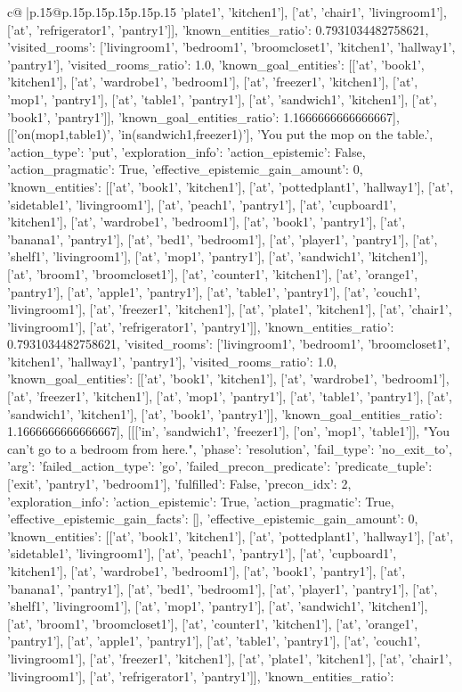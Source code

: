 \documentclass{article}
\begin{document}
{\begin{supertabular}{c@{$\;$}|p{.15\linewidth}@{}p{.15\linewidth}p{.15\linewidth}p{.15\linewidth}p{.15\linewidth}p{.15\linewidth}}
{{{'plate1', 'kitchen1'], ['at', 'chair1', 'livingroom1'], ['at', 'refrigerator1', 'pantry1']], 'known_entities_ratio': 0.7931034482758621, 'visited_rooms': ['livingroom1', 'bedroom1', 'broomcloset1', 'kitchen1', 'hallway1', 'pantry1'], 'visited_rooms_ratio': 1.0, 'known_goal_entities': [['at', 'book1', 'kitchen1'], ['at', 'wardrobe1', 'bedroom1'], ['at', 'freezer1', 'kitchen1'], ['at', 'mop1', 'pantry1'], ['at', 'table1', 'pantry1'], ['at', 'sandwich1', 'kitchen1'], ['at', 'book1', 'pantry1']], 'known_goal_entities_ratio': 1.1666666666666667}}], [['on(mop1,table1)', 'in(sandwich1,freezer1)'], 'You put the mop on the table.', {'action_type': 'put', 'exploration_info': {'action_epistemic': False, 'action_pragmatic': True, 'effective_epistemic_gain_amount': 0, 'known_entities': [['at', 'book1', 'kitchen1'], ['at', 'pottedplant1', 'hallway1'], ['at', 'sidetable1', 'livingroom1'], ['at', 'peach1', 'pantry1'], ['at', 'cupboard1', 'kitchen1'], ['at', 'wardrobe1', 'bedroom1'], ['at', 'book1', 'pantry1'], ['at', 'banana1', 'pantry1'], ['at', 'bed1', 'bedroom1'], ['at', 'player1', 'pantry1'], ['at', 'shelf1', 'livingroom1'], ['at', 'mop1', 'pantry1'], ['at', 'sandwich1', 'kitchen1'], ['at', 'broom1', 'broomcloset1'], ['at', 'counter1', 'kitchen1'], ['at', 'orange1', 'pantry1'], ['at', 'apple1', 'pantry1'], ['at', 'table1', 'pantry1'], ['at', 'couch1', 'livingroom1'], ['at', 'freezer1', 'kitchen1'], ['at', 'plate1', 'kitchen1'], ['at', 'chair1', 'livingroom1'], ['at', 'refrigerator1', 'pantry1']], 'known_entities_ratio': 0.7931034482758621, 'visited_rooms': ['livingroom1', 'bedroom1', 'broomcloset1', 'kitchen1', 'hallway1', 'pantry1'], 'visited_rooms_ratio': 1.0, 'known_goal_entities': [['at', 'book1', 'kitchen1'], ['at', 'wardrobe1', 'bedroom1'], ['at', 'freezer1', 'kitchen1'], ['at', 'mop1', 'pantry1'], ['at', 'table1', 'pantry1'], ['at', 'sandwich1', 'kitchen1'], ['at', 'book1', 'pantry1']], 'known_goal_entities_ratio': 1.1666666666666667}}], [[['in', 'sandwich1', 'freezer1'], ['on', 'mop1', 'table1']], "You can't go to a bedroom from here.", {'phase': 'resolution', 'fail_type': 'no_exit_to', 'arg': {'failed_action_type': 'go', 'failed_precon_predicate': {'predicate_tuple': ['exit', 'pantry1', 'bedroom1'], 'fulfilled': False, 'precon_idx': 2}}, 'exploration_info': {'action_epistemic': True, 'action_pragmatic': True, 'effective_epistemic_gain_facts': [], 'effective_epistemic_gain_amount': 0, 'known_entities': [['at', 'book1', 'kitchen1'], ['at', 'pottedplant1', 'hallway1'], ['at', 'sidetable1', 'livingroom1'], ['at', 'peach1', 'pantry1'], ['at', 'cupboard1', 'kitchen1'], ['at', 'wardrobe1', 'bedroom1'], ['at', 'book1', 'pantry1'], ['at', 'banana1', 'pantry1'], ['at', 'bed1', 'bedroom1'], ['at', 'player1', 'pantry1'], ['at', 'shelf1', 'livingroom1'], ['at', 'mop1', 'pantry1'], ['at', 'sandwich1', 'kitchen1'], ['at', 'broom1', 'broomcloset1'], ['at', 'counter1', 'kitchen1'], ['at', 'orange1', 'pantry1'], ['at', 'apple1', 'pantry1'], ['at', 'table1', 'pantry1'], ['at', 'couch1', 'livingroom1'], ['at', 'freezer1', 'kitchen1'], ['at', 'plate1', 'kitchen1'], ['at', 'chair1', 'livingroom1'], ['at', 'refrigerator1', 'pantry1']], 'known_entities_ratio': }}}
\end{supertabular}}
\end{document}
